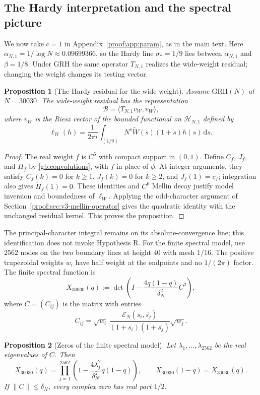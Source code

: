 \documentclass[12pt,a4paper]{amsart}
\numberwithin{equation}{section}
\def\le{\leqslant}
\def\ge{\geqslant}
\theoremstyle{plain}
\newtheorem{proposition}{Proposition}[section]
\theoremstyle{definition}
\theoremstyle{remark}
\begin{document}
\subsection{The Hardy interpretation and the spectral picture}
\label{proof:app:num:spectrum}

We now take $c=1$ in Appendix~\ref{proof:app:param}, as in the main text.
Here $\alpha_{N,1}=1/\log N\approx0.09699366$, so the Hardy line
$\sigma_*=1/9$ lies between $\alpha_{N,1}$ and $\beta=1/8$.
Under GRH the same operator $T_{N,1}$ realizes the wide-weight residual;
changing the weight changes its testing vector.

\begin{proposition}[The Hardy residual for the wide weight]
\label{proof:v9:wide-hardy-residual}
Assume $\mathrm{GRH}(N)$ at $N=30030$. The wide-weight residual
has the representation
\[
 \mathcal B=\langle T_{N,1}v_W,v_W\rangle,
\]
where $v_W$ is the Riesz vector of the bounded functional on
$\mathcal H_{N,1}$ defined by
\[
 \ell_W(h)=\frac1{2\pi i}\int_{(1/9)}
       N^s\widetilde W(s)(1+s)h(s)\,\mathrm{d}s.
\]
\end{proposition}

\begin{proof}
The real weight $f$ is $C^6$ with compact support in $(0,1)$.
Define $C_f$, $J_f$, and $H_f$ by \eqref{gb:convolutions},
with $f$ in place of $\phi$. At integer arguments, they satisfy
$C_f(k)=0$ for $k\ge1$, $J_f(k)=0$ for $k\ge2$, and $J_f(1)=c_f$;
integration also gives $\widetilde H_f(1)=0$.
These identities and $C^6$ Mellin decay justify model inversion and
boundedness of $\ell_W$. Applying the odd-character argument of
Section~\ref{proof:sec:v3-mellin-operator} gives the quadratic identity
with the unchanged residual kernel.
This proves the proposition.
\end{proof}

The principal-character integral remains on its absolute-convergence
line; this identification does not invoke Hypothesis R.
For the finite spectral model, use $2562$ nodes on the two boundary
lines at height $40$ with mesh $1/16$. The positive trapezoidal weights
$w_i$ have half weight at the endpoints and no $1/(2\pi)$ factor.
The finite spectral function is
\[
 X_{30030}(q):=\det\!\left(I-\frac{4q(1-q)}{\delta_N^2}C^2\right),
\]
where $C=(C_{ij})$ is the matrix with entries
\[
 C_{ij}=\sqrt{w_i}\,
 \frac{\mathscr E_N(s_i,\overline{s_j})}{(1+s_i)(1+\overline{s_j})}
 \sqrt{w_j}.
\]

\begin{proposition}[Zeros of the finite spectral model]
\label{proof:v9:finite-spectral-zeros}
Let $\lambda_1,\ldots,\lambda_{2562}$ be the real eigenvalues of $C$.
Then
\[
 X_{30030}(q)=\prod_{j=1}^{2562}
     \left(1-\frac{4\lambda_j^2}{\delta_N^2}q(1-q)\right),
 \qquad X_{30030}(1-q)=X_{30030}(q).
\]
If $\|C\|\le\delta_N$, every complex zero has real part $1/2$.
\end{proposition}
\end{document}
